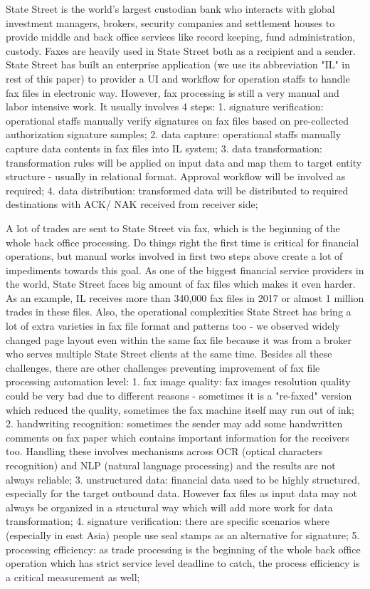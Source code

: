 \documentclass[sigconf]{acmart}
\begin{document}
State Street is the world's largest custodian bank who interacts with global investment managers, brokers, security companies and settlement houses to provide middle and back office services like record keeping, fund administration, custody. Faxes are heavily used in State Street both as a recipient and a sender. State Street has built an enterprise application (we  use its abbreviation "IL" in rest of this paper) to provider a UI and workflow for operation staffs to handle fax files in electronic way. However, fax processing is still a very manual and labor intensive work. It usually involves 4 steps:
1. signature verification: operational staffs manually verify signatures on fax files based on pre-collected authorization signature samples;
2. data capture: operational staffs manually capture data contents in fax files into IL system;
3. data transformation: transformation rules will be applied on input data and map them to target entity structure - usually in relational format. Approval workflow will be involved as required;
4. data distribution: transformed data will be distributed to required destinations with ACK/ NAK received from receiver side;

A lot of trades are sent to State Street via fax, which is the beginning of the whole back office processing. Do things right the first time is critical for financial operations, but manual works involved in first two steps above create a lot of impediments towards this goal. As one of the biggest financial service providers in the world, State Street faces big amount of fax files which makes it even harder. As an example, IL receives more than 340,000 fax files in 2017 or almost 1 million trades in these files. Also, the operational complexities State Street has bring a lot of extra varieties in fax file format and patterns too - we observed widely changed page layout even within the same fax file because it was from a broker who serves multiple State Street clients at the same time. Besides all these challenges, there are other challenges preventing improvement of fax file processing automation level:
1. fax image quality: fax images resolution quality could be very bad due to different reasons - sometimes it is a "re-faxed" version which reduced the quality, sometimes the fax machine itself may run out of ink;
2. handwriting recognition: sometimes the sender may add some handwritten comments on fax paper which contains important information for the receivers too. Handling these involves mechanisms across OCR (optical characters recognition) and NLP (natural language processing) and the results are not always reliable;
3. unstructured data: financial data used to be highly structured, especially for the target outbound data. However fax files as input data may not always be organized in a structural way which will add more work for data transformation;
4. signature verification: there are specific scenarios where (especially in east Asia) people use seal stamps as an alternative for signature;
5. processing efficiency: as trade processing is the beginning of the whole back office operation which has strict service level deadline to catch, the process efficiency is a critical measurement as well;
\end{document}
